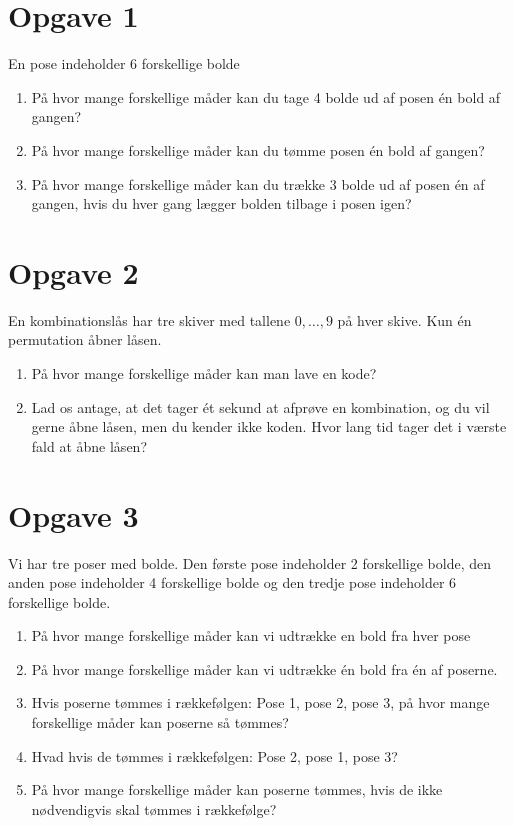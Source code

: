 \section*{Opgave 1}
En pose indeholder 6 forskellige bolde
\begin{enumerate}[label=\roman*)]
	\item På hvor mange forskellige måder kan du tage 4 bolde ud af posen én bold af gangen?
	\item På hvor mange forskellige måder kan du tømme posen én bold af gangen?
	\item På hvor mange forskellige måder kan du trække 3 bolde ud af posen én af gangen, hvis du hver gang lægger bolden tilbage i posen igen?
\end{enumerate}




\section*{Opgave 2}
En kombinationslås har tre skiver med tallene $0,\hdots, 9$ på hver skive. Kun én permutation åbner låsen.
\begin{enumerate}[label=\roman*)]
\item På hvor mange forskellige måder kan man lave en kode?
\item Lad os antage, at det tager ét sekund at afprøve en kombination, og du vil gerne åbne låsen, men du kender ikke koden. Hvor lang tid tager det i værste fald at åbne låsen?
\end{enumerate}

\section*{Opgave 3}
Vi har tre poser med bolde. Den første pose indeholder 2 forskellige bolde, den anden pose indeholder 4 forskellige bolde og den tredje pose indeholder 6 forskellige bolde. 

\begin{enumerate}[label=\roman*)]
	\item På hvor mange forskellige måder kan vi udtrække en bold fra hver pose
	\item På hvor mange forskellige måder kan vi udtrække én bold fra én af poserne. 
	\item Hvis poserne tømmes i rækkefølgen: Pose 1, pose 2, pose 3, på hvor mange forskellige måder kan poserne så tømmes?
	\item Hvad hvis de tømmes i rækkefølgen: Pose 2, pose 1, pose 3?
	\item På hvor mange forskellige måder kan poserne tømmes, hvis de ikke nødvendigvis skal tømmes i rækkefølge?
\end{enumerate}

